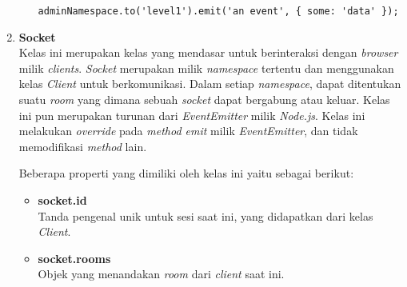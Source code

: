 \begin{enumerate}
\begin{itemize}
\begin{lstlisting}
adminNamespace.to('level1').emit('an event', { some: 'data' });
\end{lstlisting}
	
%	

	\end{itemize}
	
	\item \textbf{Socket} \\
	Kelas ini merupakan kelas yang mendasar untuk berinteraksi dengan \textit{browser} milik \textit{clients}. \textit{Socket} merupakan milik \textit{namespace} tertentu dan menggunakan kelas \textit{Client} untuk berkomunikasi. Dalam setiap \textit{namespace}, dapat ditentukan suatu \textit{room} yang dimana sebuah \textit{socket} dapat bergabung atau keluar. Kelas ini pun merupakan turunan dari \textit{EventEmitter} milik \textit{Node.js}. Kelas ini melakukan \textit{override} pada \textit{method emit} milik \textit{EventEmitter}, dan tidak memodifikasi \textit{method} lain.
	
	Beberapa properti yang dimiliki oleh kelas ini yaitu sebagai berikut:
	\begin{itemize}
		\item \textbf{socket.id} \\ Tanda pengenal unik untuk sesi saat ini, yang didapatkan dari kelas \textit{Client}.
		\item \textbf{socket.rooms} \\ Objek yang menandakan \textit{room} dari \textit{client} saat ini.
	\end{itemize}


\end{enumerate}
